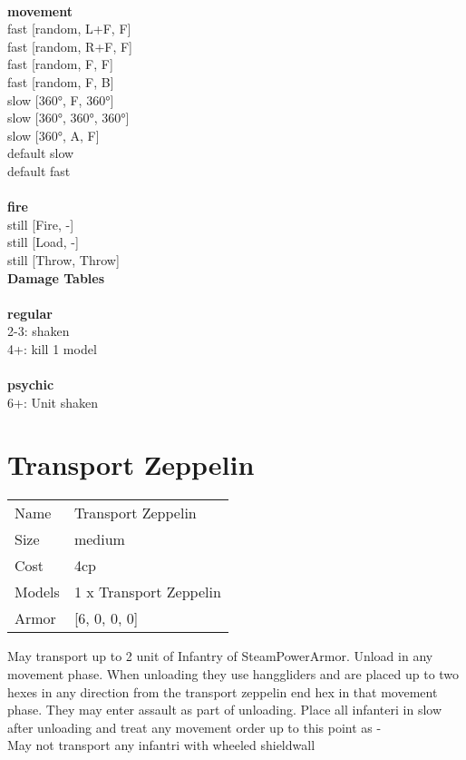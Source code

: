 \ \\ {\bf movement } \\
fast [random, L+F, F] \\
fast [random, R+F, F] \\
fast [random, F, F] \\
fast [random, F, B] \\
slow [360°, F, 360°] \\
slow [360°, 360°, 360°] \\
slow [360°, A, F] \\
default slow \\
default fast \\
\ \\ {\bf fire } \\
still [Fire, -] \\
still [Load, -] \\
still [Throw, Throw] \\


{\bf Damage Tables} \\
\ \\ {\bf regular } \\
2-3: shaken \\
4+: kill 1 model \\
\ \\ {\bf psychic } \\
6+: Unit shaken \\










\pagebreak\pagebreak

\section{ Transport Zeppelin }

\begin{tabular}{ll}
  Name & Transport Zeppelin \\
  Size & medium\\
  Cost & 4cp\\
  Models & 1 x Transport Zeppelin\\
  Armor & [6, 0, 0, 0]\\
\end{tabular}

\noindent May transport up to 2 unit of Infantry of SteamPowerArmor. Unload in any movement phase. When unloading they use hanggliders and are placed up to two hexes in any direction from the transport zeppelin end hex in that movement phase. They may enter assault as part of unloading. Place all infanteri in slow after unloading and treat any movement order up to this point as -\\ 
May not transport any infantri with wheeled shieldwall\\ 


